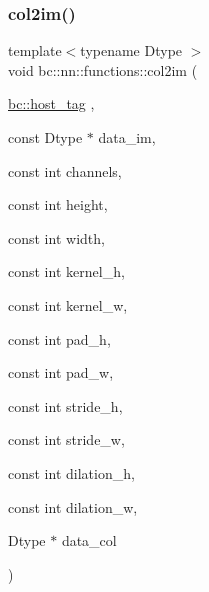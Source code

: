 \subsubsection{\texorpdfstring{col2im()}{col2im()}}
{\footnotesize\ttfamily template$<$typename Dtype $>$ \\
void bc\+::nn\+::functions\+::col2im (\begin{DoxyParamCaption}\item[{\hyperlink{structbc_1_1host__tag}{bc\+::host\+\_\+tag}}]{,  }\item[{const Dtype $\ast$}]{data\+\_\+im,  }\item[{const int}]{channels,  }\item[{const int}]{height,  }\item[{const int}]{width,  }\item[{const int}]{kernel\+\_\+h,  }\item[{const int}]{kernel\+\_\+w,  }\item[{const int}]{pad\+\_\+h,  }\item[{const int}]{pad\+\_\+w,  }\item[{const int}]{stride\+\_\+h,  }\item[{const int}]{stride\+\_\+w,  }\item[{const int}]{dilation\+\_\+h,  }\item[{const int}]{dilation\+\_\+w,  }\item[{Dtype $\ast$}]{data\+\_\+col }\end{DoxyParamCaption})}

\mbox{\label{namespacebc_1_1nn_1_1functions_a954705d9faf8e88f29a8492defbc61e0}} 
